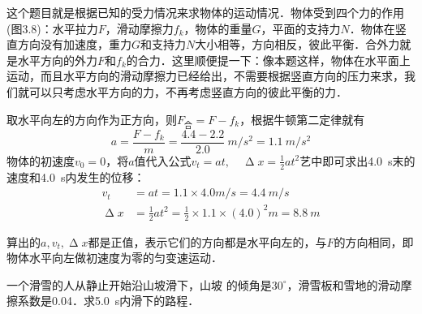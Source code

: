 \begin{solution}
    这个题目就是根据已知的受力情况来求物体的运动情况．物体受到四个力的作用(图3.8)：水平拉力$F$，滑动摩擦力$f_k$，物体的重量$G$，平面的支持力$N$．物体在竖直方向没有加速度，重力$G$和支持力$N$大小相等，方向相反，彼此平衡．合外力就是水平方向的外力$F$和$f_k$的合力．这里顺便提一下：像本题这样，物体在水平面上运动，而且水平方向的滑动摩擦力已经给出，不需要根据竖直方向的压力来求，我们就可以只考虑水平方向的力，不再考虑竖直方向的彼此平衡的力．

    取水平向左的方向作为正方向，则$F_{\text{合}}=F-f_k$，根据牛顿第二定律就有
    \[a=\frac{F-f_k}{m}=\frac{4.4-2.2}{2.0}~\si{m/s^2}=\SI{1.1}{m/s^2} \]
    物体的初速度$v_0=0$，将$a$值代入公式$v_t=at,\quad \upDelta x=\frac{1}{2}at^2$艺中即可求出\SI{4.0}{s}末的速度和\SI{4.0}{s}内发生的位移：
    \[\begin{split}
            v_t        & =at=1.1\times 4.0\si{m/s} =\SI{4.4}{m/s}                                \\
            \upDelta x & =\frac{1}{2}at^2=\frac{1}{2}\times 1.1\times (4.0)^2 \si{m}=\SI{8.8}{m}
        \end{split} \]
\end{solution}
算出的$a,v_t,\upDelta x$都是正值，表示它们的方向都是水平向左的，与$F$的方向相同，即物体水平向左做初速度为零的匀变速运动．

\begin{example}
    一个滑雪的人从静止开始沿山坡滑下，山坡
    的倾角是$30^\circ$，滑雪板和雪地的滑动摩擦系数是0.04．求\SI{5.0}{s}内滑下的路程．
\end{example}


